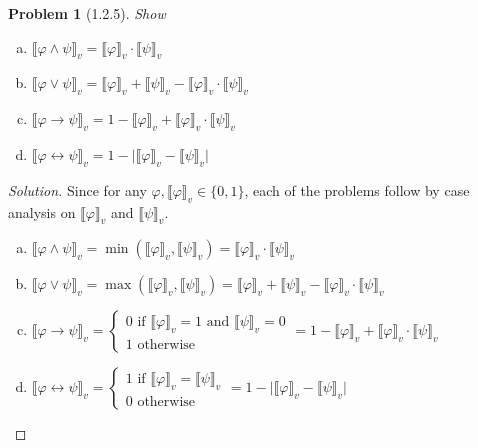 \documentclass[letter]{article}
\newtheorem{problem}{Problem}
\theoremstyle{definition}
\newenvironment{solution}
{\begin{proof}[Solution]}
	{\end{proof}}
\renewcommand{\phi}{\varphi}
\begin{document}
\newcommand{\den}[1]{\llbracket #1 \rrbracket_v}
\begin{problem}[1.2.5]
    Show
 \begin{enumerate}[(a)]
 \item $\den{\phi \land \psi} = \den{\phi} \cdot \den{\psi}$
 \item $\den{\phi \lor \psi} = \den{\phi} + \den{\psi} - \den{\phi} \cdot \den\psi$
 \item $\den{\phi \to \psi} = 1 - \den{\phi} + \den{\phi} \cdot \den{\psi}$
 \item $\den{\phi \leftrightarrow \psi} = 1 - \big|\den{\phi} - \den{\psi} \big|$
 \end{enumerate}
\end{problem}
\begin{solution}
  Since for any $\phi, \den{\phi} \in \{0, 1\}$, each of the problems follow by case analysis on $\den{\phi}$ and $\den{\psi}$.
  \begin{enumerate}[(a)]
  \item
    $\den{\phi \land \psi} = \min(\den{\phi}, \den{\psi}) = \den{\phi} \cdot \den{\psi}$
  \item
    $\den{\phi \lor \psi} = \max(\den{\phi}, \den{\psi}) = \den{\phi} + \den{\psi} - \den{\phi} \cdot \den\psi$
  \item
    $\den{\phi \to \psi} =
    \begin{cases}
      0 \text{ if $\den{\phi} = 1$ and $\den{\psi} = 0$} \\
      1 \text{ otherwise}
    \end{cases}
    = 1 - \den{\phi} + \den{\phi} \cdot \den{\psi}$
  \item
    $\den{\phi \leftrightarrow \psi} =
    \begin{cases}
      1 \text{ if $\den{\phi} = \den{\psi}$} \\
      0 \text{ otherwise}
    \end{cases}
    = 1 - \big|\den{\phi} - \den{\psi} \big|$
  \end{enumerate}
\end{solution}
\end{document}
